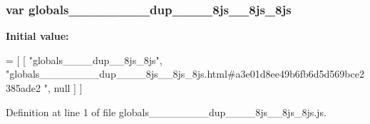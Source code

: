 \subsubsection[{globals\+\_\+\+\_\+\+\_\+\+\_\+\+\_\+\+\_\+\+\_\+\+\_\+dup\+\_\+\+\_\+\+\_\+\+\_\+8js\+\_\+\+\_\+8js\+\_\+8js}]{\setlength{\rightskip}{0pt plus 5cm}var globals\+\_\+\+\_\+\+\_\+\+\_\+\+\_\+\+\_\+\+\_\+\+\_\+dup\+\_\+\+\_\+\+\_\+\+\_\+8js\+\_\+\+\_\+8js\+\_\+8js}\label{globals________________dup________8js____8js__8js_8js_aea750ed5fcc320ed936df67d6d1d4f6d}
{\bfseries Initial value\+:}
\begin{DoxyCode}
=
[
    [ \textcolor{stringliteral}{"globals\_\_\_\_dup\_\_8js\_8js"}, \textcolor{stringliteral}{"globals\_\_\_\_\_\_\_\_dup\_\_\_\_8js\_\_8js\_8js.html#a3e01d8ee49b6fb6d5d569bce2385ade2
      "}, null ]
]
\end{DoxyCode}


Definition at line 1 of file globals\+\_\+\+\_\+\+\_\+\+\_\+\+\_\+\+\_\+\+\_\+\+\_\+dup\+\_\+\+\_\+\+\_\+\+\_\+8js\+\_\+\+\_\+8js\+\_\+8js.\+js.


